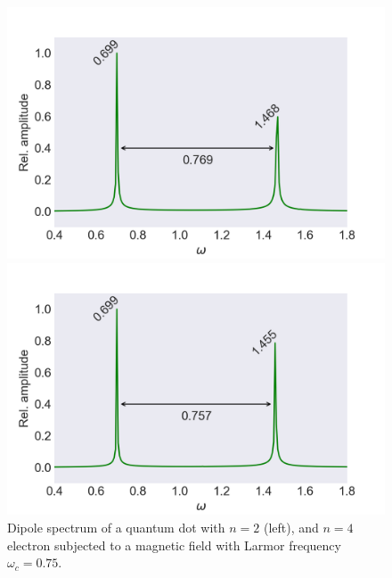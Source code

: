 \begin{figure}[!h]
    \centering
    \begin{minipage}{0.49\textwidth}
        \includegraphics[clip=2em 0em 10em 0em, width=\textwidth]
        {results/figures/B_field/n=2/b_spectrum_omc075.png}
    \end{minipage}\hfill 
    \begin{minipage}{0.49\textwidth}
        \includegraphics[clip=0em 0em 10em 0em, width=\textwidth]
        {results/figures/B_field/n=4/b_spectrum_n=4_omc=075.png}
    \end{minipage}
    \caption{Dipole spectrum of a quantum dot with $n=2$ (left), and $n=4$ electron 
    subjected to a magnetic field with Larmor frequency $\omega_c=0.75$.}
    \label{fig:b_omc075}
\end{figure}

